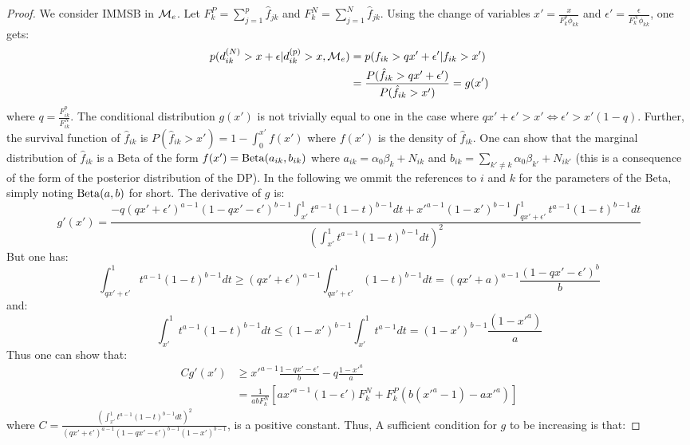 \begin{proof}
We consider IMMSB in $\mathcal{M}_e$. Let $F_k^P=\sum_{j=1}^p \hat f_{jk}$ and $F_k^N=\sum_{j=1}^N \hat f_{jk}$.
Using the change of variables $x'=\frac{x}{F_k^p \phi_{kk}}$ and $\epsilon' = \frac{\epsilon}{F_k^N \phi_{kk}}$, one gets:
\begin{align*}
p(d_{ik}^{(N)} > x+\epsilon | d_{ik}^{(p)} > x, \mathcal{M}_e) &= p(f_{ik} > qx'+\epsilon' | f_{ik} > x') \\
&=\frac{P(\hat f_{ik} > qx'+\epsilon')}{P(\hat f_{ik} > x')} = g(x')
\end{align*}
where $q=\frac{F_{ik}^p}{F_{ik}^N}$. The conditional distribution $g(x')$ is not trivially equal to one in the case where $qx'+\epsilon' > x' \Leftrightarrow \epsilon' > x'(1-q)$. Further, the survival function of $\hat f_{ik}$ is $P(\hat f_{ik} >x') = 1-\int_0^{x'} f(x')$ where $f(x')$ is the density of $\hat f_{ik}$. One can show that the marginal distribution of $\hat f_{ik}$ is a Beta of the form $f(x')=\mathrm{Beta}(a_{ik}, b_{ik})$  where $a_{ik} = \alpha_0\beta_k + N_{ik}$ and $b_{ik} = \sum_{k'\neq k} \alpha_0\beta_{k'} + N_{ik'}$  (this is a consequence of the form of the posterior distribution of the DP). In the following we ommit the references to $i$ and $k$ for the parameters of the Beta, simply noting $\mathrm{Beta}(a, b)$ for short. The derivative of $g$ is:
\begin{equation*}
g'(x') = \frac{-q (qx'+\epsilon')^{a-1}(1-qx'-\epsilon')^{b-1}\int_{x'}^1t^{a-1} (1-t)^{b-1} dt + x'^{a-1}(1-x')^{b-1}\int_{qx'+\epsilon'}^1 t^{a-1}(1-t)^{b-1} dt}{\left(\int_{x'}^1t^{a-1}(1-t)^{b-1}dt\right)^2}
\end{equation*}
But one has:
\begin{equation*}
\int_{qx'+\epsilon'}^1 t^{a-1}(1-t)^{b-1}dt \geq (qx'+\epsilon')^{a-1}\int_{qx'+\epsilon'}^1 (1-t)^{b-1}dt = (qx'+a)^{a-1}\frac{(1-qx'-\epsilon')^b}{b}
\end{equation*}
and:
\begin{equation*}
\int_{x'}^1 t^{a-1}(1-t)^{b-1}dt \leq (1-x')^{b-1}\int_{x'}^1 t^{a-1}dt = (1-x')^{b-1}\frac{(1-x'^a)}{a}
\end{equation*}
Thus one can show that:
\begin{align*}
Cg'(x') &\geq x'^{a-1} \frac{1-qx'-\epsilon'}{b} -q\frac{1-x'^a}{a}  \\
        &= \frac{1}{abF_k^N} \left[ ax'^{a-1}(1-\epsilon')F_k^N + F_k^P (b(x'^a-1) - ax'^a) \right]
\end{align*}
where $C=\frac{\left(\int_{x'}^1t^{a-1}(1-t)^{b-1}dt\right)^2}{(qx'+\epsilon')^{a-1}(1-qx'-\epsilon')^{b-1}(1-x')^{b-1}}$, is a positive constant. Thus, A sufficient condition for $g$ to be increasing is that:

\end{proof}
